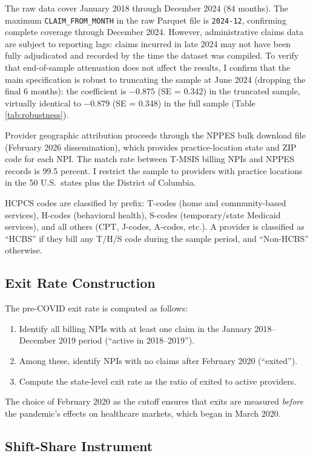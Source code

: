 \documentclass[12pt]{article}
\begin{document}
The raw data cover January 2018 through December 2024 (84 months). The maximum \texttt{CLAIM\_FROM\_MONTH} in the raw Parquet file is \texttt{2024-12}, confirming complete coverage through December 2024. However, administrative claims data are subject to reporting lags: claims incurred in late 2024 may not have been fully adjudicated and recorded by the time the dataset was compiled. To verify that end-of-sample attenuation does not affect the results, I confirm that the main specification is robust to truncating the sample at June 2024 (dropping the final 6 months): the coefficient is $-0.875$ (SE = 0.342) in the truncated sample, virtually identical to $-0.879$ (SE = 0.348) in the full sample (Table \ref{tab:robustness}).

Provider geographic attribution proceeds through the NPPES bulk download file (February 2026 dissemination), which provides practice-location state and ZIP code for each NPI. The match rate between T-MSIS billing NPIs and NPPES records is 99.5 percent. I restrict the sample to providers with practice locations in the 50 U.S.\ states plus the District of Columbia.

HCPCS codes are classified by prefix: T-codes (home and community-based services), H-codes (behavioral health), S-codes (temporary/state Medicaid services), and all others (CPT, J-codes, A-codes, etc.). A provider is classified as ``HCBS'' if they bill any T/H/S code during the sample period, and ``Non-HCBS'' otherwise.

\subsection{Exit Rate Construction}

The pre-COVID exit rate is computed as follows:
\begin{enumerate}
\item Identify all billing NPIs with at least one claim in the January 2018--December 2019 period (``active in 2018--2019'').
\item Among these, identify NPIs with no claims after February 2020 (``exited'').
\item Compute the state-level exit rate as the ratio of exited to active providers.
\end{enumerate}

The choice of February 2020 as the cutoff ensures that exits are measured \emph{before} the pandemic's effects on healthcare markets, which began in March 2020.

\subsection{Shift-Share Instrument}
\end{document}
